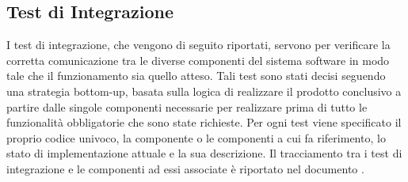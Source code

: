 \documentclass[a4paper, titlepage]{article}
\begin{document}
\newpage
\subsection{Test di Integrazione}
I test di integrazione, che vengono di seguito riportati, servono per verificare la corretta comunicazione tra le diverse componenti del sistema software in modo tale che il funzionamento sia quello atteso.
\newline Tali test sono stati decisi seguendo una strategia bottom-up, basata sulla logica di realizzare il prodotto conclusivo a partire dalle singole componenti necessarie per realizzare  prima di tutto le funzionalità obbligatorie che sono state richieste.
\newline Per ogni test viene specificato il proprio codice univoco, la componente o le componenti a cui fa riferimento, lo stato di implementazione attuale e la sua descrizione. 
\newline Il tracciamento tra i test di integrazione e le componenti ad essi associate è riportato nel documento .
\end{document}
